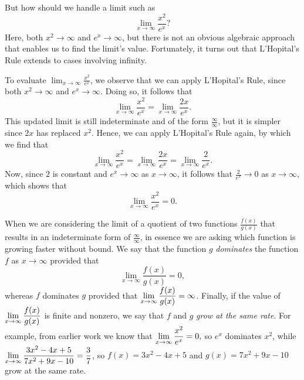 But how should we handle a limit such as
$$\lim_{x \to \infty} \frac{x^2}{e^x}?$$
Here, both $x^2 \to \infty$ and $e^x \to \infty$, but there is not an obvious algebraic approach that enables us to find the limit's value.  Fortunately, it turns out that L'Hopital's Rule extends to cases involving infinity.


To evaluate $\lim_{x \to \infty} \frac{x^2}{e^x}$, we observe that we can apply L'Hopital's Rule, since both $x^2 \to \infty$ and $e^x \to \infty$.  Doing so, it follows that
$$\lim_{x \to \infty} \frac{x^2}{e^x} = \lim_{x \to \infty} \frac{2x}{e^x}.$$
This updated limit is still indeterminate and of the form $\frac{\infty}{\infty}$, but it is simpler since $2x$ has replaced $x^2$.  Hence, we can apply L'Hopital's Rule again, by which we find that
$$\lim_{x \to \infty} \frac{x^2}{e^x} = \lim_{x \to \infty} \frac{2x}{e^x} = \lim_{x \to \infty} \frac{2}{e^x}.$$
Now, since $2$ is constant and $e^x \to \infty$ as $x \to \infty$, it follows that $\frac{2}{e^x} \to 0$ as $x \to \infty$, which shows that
$$\lim_{x \to \infty} \frac{x^2}{e^x} = 0.$$


When we are considering the limit of a quotient of two functions $\frac{f(x)}{g(x)}$ that results in an indeterminate form of $\frac{\infty}{\infty}$, in essence we are asking which function is growing faster without bound.  We say that the function $g$ \emph{dominates} the function $f$ as $x \to \infty$ provided that 
$$\lim_{x \to \infty} \frac{f(x)}{g(x)} = 0,$$
whereas $f$ dominates $g$ provided that $\displaystyle\lim_{x \to \infty} \frac{f(x)}{g(x)} = \infty$.  Finally, if the value of $\displaystyle\lim_{x \to \infty} \frac{f(x)}{g(x)}$ is finite and nonzero, we say that $f$ and $g$ \emph{grow at the same rate}.  For example, from earlier work we know that $\displaystyle\lim_{x \to \infty} \frac{x^2}{e^x} = 0,$ so $e^x$ dominates $x^2$, while $\displaystyle\lim_{x \to \infty} \frac{3x^2 - 4x + 5}{7x^2 + 9x - 10} = \frac{3}{7}$, so $f(x) = 3x^2 - 4x + 5$ and $g(x) = 7x^2 + 9x - 10$ grow at the same rate.

